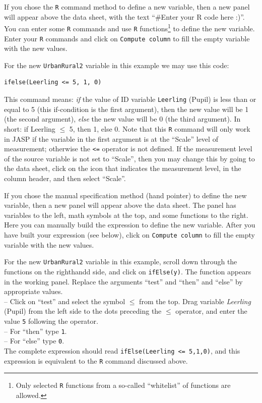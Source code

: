 \documentclass[
]{book}
\begin{document}
If you chose the \texttt{R} command method to define a new variable, then a new panel will appear above the data sheet, with the text ``\#Enter your R code here :)''. You can enter some \texttt{R} commands and use \texttt{R} functions\footnote{Only selected \texttt{R} functions from a so-called ``whitelist'' of functions are allowed.} to define the new variable. Enter your \texttt{R} commands and click on \texttt{Compute\ column} to fill the empty variable with the new values.

For the new \texttt{UrbanRural2} variable in this example we may use this code:

\begin{verbatim}
ifelse(Leerling <= 5, 1, 0) 
\end{verbatim}

This command means: \emph{if} the value of ID variable \texttt{Leerling} (Pupil) is less than or equal to 5 (this if-condition is the first argument), then the new value will be 1 (the second argument), \emph{else} the new value will be 0 (the third argument). In short: if Leerling \(\leq\) 5, then 1, else 0.
Note that this \texttt{R} command will only work in JASP if the variable in the first argument is at the ``Scale'' level of measurement; otherwise the \texttt{\textless{}=} operator is not defined. If the measurement level of the source variable is not set to ``Scale'', then you may change this by going to the data sheet, click on the icon that indicates the measurement level, in the column header, and then select ``Scale''.

If you chose the manual specification method (hand pointer) to define the new variable, then a new panel will appear above the data sheet. The panel has variables to the left, math symbols at the top, and some functions to the right. Here you can manually build the expression to define the new variable. After you have built your expression (see below), click on \texttt{Compute\ column} to fill the empty variable with the new values.

For the new \texttt{UrbanRural2} variable in this example, scroll down through the functions on the righthandd side, and click on \texttt{ifElse(y)}. The function appears in the working panel. Replace the arguments ``test'' and ``then'' and ``else'' by appropriate values.\\
-- Click on ``test'' and select the symbol \(\leq\) from the top. Drag variable \emph{Leerling} (Pupil) from the left side to the dots preceding the \(\leq\) operator, and enter the value \texttt{5} following the operator.\\
-- For ``then'' type \texttt{1}.\\
-- For ``else'' type \texttt{0}.\\
The complete expression should read \texttt{ifElse(Leerling\ \textless{}=\ 5,1,0)}, and this expression is equivalent to the \texttt{R} command discussed above.
\end{document}
